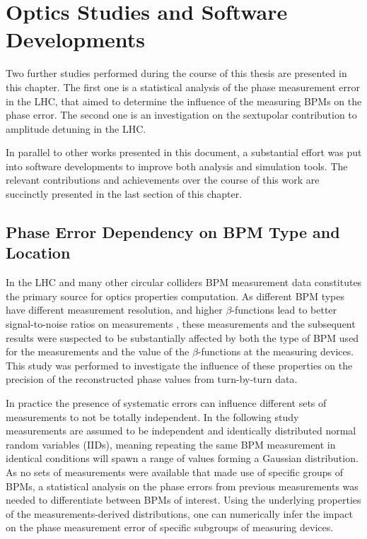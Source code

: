 \chapter{Optics Studies and Software Developments}
\label{chapter:Others_and_Software}

Two further studies performed during the course of this thesis are presented in this chapter.
The first one is a statistical analysis of the phase measurement error in the LHC, that aimed to determine the influence of the measuring BPMs on the phase error.
The second one is an investigation on the sextupolar contribution to amplitude detuning in the LHC.

In parallel to other works presented in this document, a substantial effort was put into software developments to improve both analysis and simulation tools.
The relevant contributions and achievements over the course of this work are succinctly presented in the last section of this chapter.


\section{Phase Error Dependency on BPM Type and Location}
\label{section:phase_error_dependency_on_bpm_type_and_location}

In the LHC and many other circular colliders BPM measurement data constitutes the primary source for optics properties computation.
As different BPM types~\cite{CERN:Equipment_Codes} have different measurement resolution, and higher \(\beta\)-functions lead to better signal-to-noise ratios on measurements , these measurements and the subsequent results were suspected to be substantially affected by both the type of BPM used for the measurements and the value of the \(\beta\)-functions at the measuring devices.
This study was performed to investigate the influence of these properties on the precision of the reconstructed phase values from turn-by-turn data.

In practice the presence of systematic errors can influence different sets of measurements to not be totally independent.
In the following study measurements are assumed to be independent and identically distributed normal random variables (IIDs), meaning repeating the same BPM measurement in identical conditions will spawn a range of values forming a Gaussian distribution.
As no sets of measurements were available that made use of specific groups of BPMs, a statistical analysis on the phase errors from previous measurements was needed to differentiate between BPMs of interest. 
Using the underlying properties of the measurements-derived distributions, one can numerically infer the impact on the phase measurement error of specific subgroups of measuring devices.

